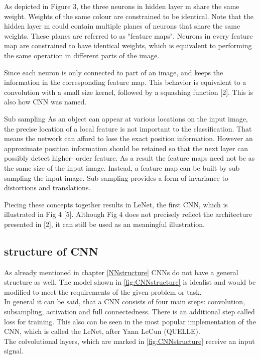 \documentclass{sig-alternate-05-2015}
\begin{document}
As depicted in Figure 3, the three neurons in hidden layer m share the same weight. Weights of the same colour are constrained to be identical. Note that the hidden layer m could contain multiple planes of neurons that share the same weights. These planes are referred to as "feature maps". Neurons in every feature map are constrained to have identical weights, which is equivalent to performing the same operation in different parts of the image.

Since each neuron is only connected to part of an image, and keeps the information in the corresponding feature map. This behavior is equivalent to a convolution with a small size kernel, followed by a squashing function [2]. This is also how CNN was named.

Sub sampling
As an object can appear at various locations on the input image, the precise location of a local feature is not important to the classification. That means the network can afford to lose the exact position information. However an approximate position information should be retained so that the next layer can possibly detect higher- order feature. As a result the feature maps need not be as the same size of the input image. Instead, a feature map can be built by sub sampling the input image. Sub sampling provides a form of invariance to distortions and translations.

Piecing these concepts together results in LeNet, the first CNN, which is illustrated in Fig 4 [5]. Although Fig 4 does not precisely reflect the architecture presented in [2], it can still be used as an meaningful illustration.



\subsection{structure of CNN}
As already mentioned in chapter \ref{NNstructure} CNNs do not have a general structure as well. The model shown in \ref{fig:CNNstructure} is idealist and would be modified to meet the requirements of the given problem or task. \\
In general it can be said, that a CNN consists of four main steps: convolution, subsampling, activation and full connectedness. There is an additional step called loss for training. This also can be seen in the most popular implementation of the CNN, which is called the LeNet, after Yann LeCun (QUELLE).\\
The colvolutional layers, which are marked in \ref{fig:CNNstructure} receive an input signal.
\end{document}
